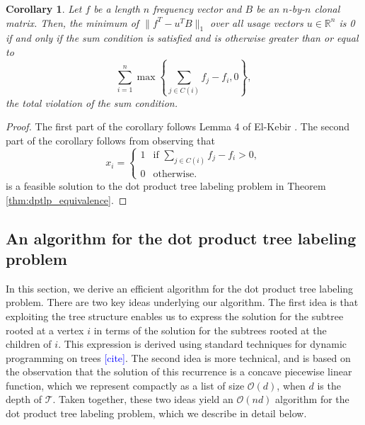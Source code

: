 \documentclass[10pt]{article}
\newtheorem{corollary}{Corollary}
\newcommand{\henri}[1]{\textcolor{blue}{[#1]}}
\newcommand{\tree}{\mathcal{T}}
\begin{document}
\begin{corollary}
    Let $f$ be a length $n$ frequency vector and $B$ be an $n$-by-$n$ clonal matrix.
    Then, the minimum of $\lVert f^T - u^TB \rVert_1$ over all usage vectors $u \in \mathbb{R}^n$
    is 0 if and only if the sum condition is satisfied and is otherwise
    greater than or equal to 
    \[\sum_{i=1}^n \max\left\{\sum_{j \in C(i)} f_j - f_i, 0\right\},\]
    the total violation of the sum condition.
\end{corollary}
\begin{proof}
    The first part of the corollary follows Lemma 4 of El-Kebir \cite{el-kebir_reconstruction_2015}. 
    The second part of the corollary follows from observing that 
    \[x_i = \begin{cases}
        1 &\text{if } \sum_{j \in C(i)} f_j - f_i > 0,\\
        0 &\text{otherwise.}
    \end{cases}\]
    is a feasible solution to the dot product tree labeling problem in Theorem \ref{thm:dptlp_equivalence}.
\end{proof}

\subsection{An algorithm for the dot product tree labeling problem}
\label{subsec:dptlp_algo}
In this section, we derive an efficient algorithm for the dot product tree labeling problem. 
There are two key ideas underlying our algorithm. The first idea is that 
exploiting the tree structure enables us to express the solution for the subtree rooted at a vertex $i$
in terms of the solution for the subtrees rooted at the children of $i$. This expression is derived using standard techniques 
for dynamic programming on trees \henri{cite}. The second idea is more technical, and is based on the observation
that the solution of this recurrence is a concave piecewise linear function, which we represent compactly as a list of size 
$\mathcal{O}(d)$, when $d$ is the depth of $\tree$. Taken together, these two ideas yield an $\mathcal{O}(nd)$ algorithm for the dot product tree 
labeling problem, which we describe in detail below.
\end{document}
